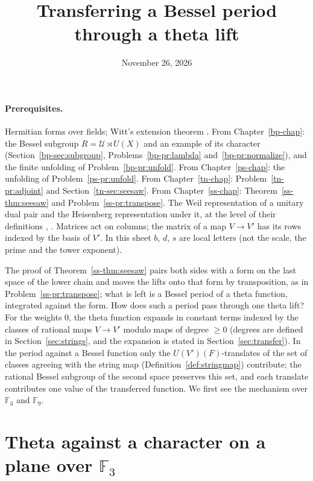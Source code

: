 \documentclass[reqno]{amsart}
\title{Transferring a Bessel period through a theta lift}
\author{}
\date{November 26, 2026}
\newcounter{chap}
\theoremstyle{definition}
\theoremstyle{plain}
\theoremstyle{remark}
\newcommand{\F}{\mathbb{F}}
\newcommand{\Uc}{\mathcal{U}}
\begin{document}
\maketitle
{}\label{chap}

\paragraph{Prerequisites.}
Hermitian forms over fields; Witt's extension theorem \cite{Sch}.  From Chapter~\ref{bp-chap}: the Bessel subgroup \(R=\Uc\rtimes U(X)\) and an example of its character (Section~\ref{bp-sec:subgroup}, Problems~\ref{bp-pr:lambda} and~\ref{bp-pr:normalize}), and the finite unfolding of Problem~\ref{bp-pr:unfold}.  From Chapter~\ref{ps-chap}: the unfolding of Problem~\ref{ps-pr:unfold}.  From Chapter~\ref{tn-chap}: Problem~\ref{tn-pr:adjoint} and Section~\ref{tn-sec:seesaw}.  From Chapter~\ref{ss-chap}: Theorem~\ref{ss-thm:seesaw} and Problem~\ref{ss-pr:transpose}.  The Weil representation of a unitary dual pair and the Heisenberg representation under it, at the level of their definitions \cite{We}, \cite[\S1]{Ku}.  Matrices act on columns; the matrix of a map \(V\to V'\) has its rows indexed by the basis of \(V'\).  In this sheet \(b\), \(d\), \(s\) are local letters (not the scale, the prime and the tower exponent).

\medskip
The proof of Theorem~\ref{ss-thm:seesaw} pairs both sides with a form on the last space of the lower chain and moves the lifts onto that form by transposition, as in Problem~\ref{ss-pr:transpose}; what is left is a Bessel period of a theta function, integrated against the form.  How does such a period pass through one theta lift?  For the weights \(0\), the theta function expands in constant terms indexed by the classes of rational maps \(V\to V'\) modulo maps of degree \(\ge0\) (degrees are defined in Section~\ref{sec:strings}, and the expansion is stated in Section~\ref{sec:transfer}).  In the period against a Bessel function only the \(U(V')(F)\)-translates of the set of classes agreeing with the string map (Definition~\ref{def:stringmap}) contribute; the rational Bessel subgroup of the second space preserves this set, and each translate contributes one value of the transferred function.  We first see the mechanism over \(\F_3\) and \(\F_9\).


\section{Theta against a character on a plane over \texorpdfstring{\(\F_3\)}{F3}}\label{sec:plane}
\end{document}
